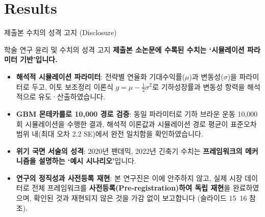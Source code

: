 \section{Results}

\begin{frame}{제출본 수치의 성격 고지 (Disclosure)}
\begin{alertblock}{학술 연구 윤리 및 수치의 성격 고지}
  \textbf{제출본 소논문에 수록된 수치는 `시뮬레이션 파라미터 기반'입니다.}
\end{alertblock}

\vspace{2mm}
\begin{itemize}
  \setlength{\itemsep}{6pt}
  \item \textbf{해석적 시뮬레이션 파라미터}:
  전략별 연율화 기대수익률($\mu$)과 변동성($\sigma$)을 파라미터로 두고, 이토 보조정리 이론식 $g = \mu - \frac{1}{2}\sigma^2$로 기하성장률과 변동성 항력을 해석적으로 유도·산출하였습니다.
  
  \item \textbf{GBM 몬테카를로 10,000 경로 검증}:
  동일 파라미터로 기하 브라운 운동 10,000회 시뮬레이션을 수행한 결과, 해석적 이론값과 시뮬레이션 경로 평균이 표준오차 범위 내(최대 오차 2.2 SE)에서 완전 일치함을 확인하였습니다.
  
  \item \textbf{위기 국면 서술의 성격}:
  2020년 팬데믹, 2022년 긴축기 수치는 \textbf{프레임워크의 메커니즘을 설명하는 `예시 시나리오'}입니다.
  
  \item \textbf{연구의 정직성과 사전등록 재현}:
  본 연구진은 이에 안주하지 않고, 실제 시장 데이터로 전체 프레임워크를 \textbf{사전등록(Pre-registration)하여 독립 재현}을 완료하였으며, 확인된 것과 재현되지 않은 것을 가감 없이 보고합니다 (슬라이드 15~16 참조).
\end{itemize}
\end{frame}

